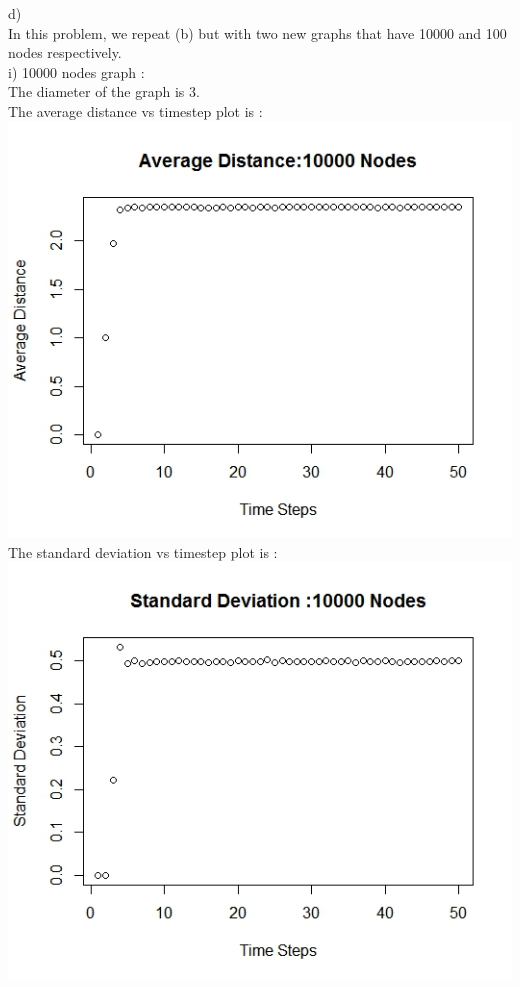 \documentclass{article}
\begin{document}
d)\\
In this problem, we repeat (b) but with two new graphs that have 10000 and 100 nodes respectively.\\
i) 10000 nodes graph :\\
The diameter of the graph is 3.\\
The average distance vs timestep plot is :\\
\includegraphics[scale=0.4]{p1i} \\
The standard deviation vs timestep plot is :\\
\includegraphics[scale=0.4]{p1k} \\
\end{document}
